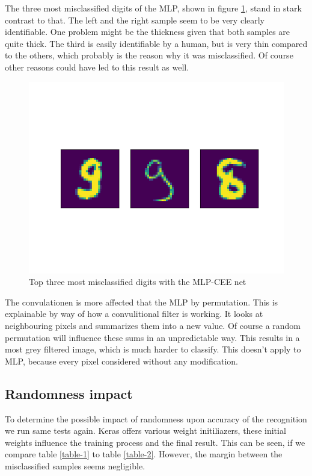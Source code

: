 \documentclass{article}
\begin{document}
The three most misclassified digits of the MLP, shown in figure \ref{fig:mlp}, stand in stark contrast to that.
The left and the right sample seem to be very clearly identifiable.
One problem might be the thickness given that both samples are quite thick.
The third is easily identifiable by a human, but is very thin compared to the others, which probably is the reason why it was misclassified.
Of course other reasons could have led to this result as well.


\begin{figure}[H]
	\centering
	\includegraphics[width=0.5\linewidth]{img/mpl_categorial_cross_non_perm.png}
	\caption{Top three most misclassified digits with the MLP-CEE net}
	\label{fig:mlp}
\end{figure}


The convulationen is more affected that the MLP by permutation.
This is explainable by way of how a convulitional filter is working.
It looks at neighbouring pixels and summarizes them into a new value.
Of course a random permutation will influence these sums in an unpredictable way.
This results in a most grey filtered image, which is much harder to classify.
This doesn't apply to MLP, because every pixel considered without any modification.


\subsection{Randomness impact}
To determine the possible impact of randomness upon accuracy of the recognition we run same tests again.
Keras offers various weight initiliazers, these initial weights influence the training process and the final result.
This can be seen, if we compare table \ref{table-1} to table \ref{table-2}.
However, the margin between the misclassified samples seems negligible.
\end{document}
